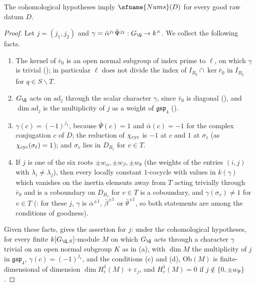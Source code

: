 \begin{proposition}\label{pf:modularity:nums}
The cohomological hypotheses imply $\sfname{Nums}(D)$ for every good raw datum $D$.
\end{proposition}

\begin{proof}
Let $j=(j_1,j_2)$ and $\gamma=\bar\alpha^{j_1}\bar\Psi^{j_2}:G_\Q\to k^\times$. We collect the following facts.
\begin{enumerate}[label=(\alph*)]
\item The kernel of $\bar r_0$ is an open normal subgroup of index prime to $\ell$, on which $\gamma$ is trivial
(); in particular $\ell$ does not divide the index of $I_{B_q}\cap\ker\bar r_0$ in
$I_{B_q}$ for $q\in S\smallsetminus T$.
\item $G_\Q$ acts on $\mathrm{ad}_j$ through the scalar character $\gamma$, since $\bar r_0$ is diagonal
(), and $\dim\mathrm{ad}_j$ is the multiplicity of $j$ as a weight of $\mathfrak{gsp}_4$
().
\item $\gamma(c)=(-1)^{j_1}$, because $\bar\Psi(c)=1$ and $\bar\alpha(c)=-1$ for the complex conjugation $c$ of $D$; the
reduction of $\chi_{\mathrm{cyc}}$ is $-1$ at $c$ and $1$ at $\sigma_\ell$ (as $\chi_{\mathrm{cyc}}(\sigma_\ell)=1$); and $\sigma_v$
lies in $D_{B_v}$ for $v\in T$.
\item If $j$ is one of the six roots $\pm w_\alpha,\pm w_\beta,\pm w_\theta$ (the weights of the entries $(i,j)$ with
$\lambda_i\ne\lambda_j$), then every locally constant $1$-cocycle with values in $k(\gamma)$ which vanishes on the inertia
elements away from $T$ acting trivially through $\bar r_0$ and is a coboundary on $D_{B_v}$ for $v\in T$ is a coboundary,
and $\gamma(\sigma_v)\ne1$ for $v\in T$ (: for these $j$, $\gamma$ is $\bar\alpha^{\pm1}$,
$\bar\beta^{\pm1}$ or $\bar\theta^{\pm1}$, so both statements are among the conditions of goodness).
\end{enumerate}
Given these facts,  gives the assertion for $j$: under the cohomological hypotheses, for every finite
$k[G_{\Q,S}]$-module $M$ on which $G_\Q$ acts through a character $\gamma$ trivial on an open normal subgroup $K$ as in (a),
with $\dim M$ the multiplicity of $j$ in $\mathfrak{gsp}_4$, $\gamma(c)=(-1)^{j_1}$, and the conditions (c) and (d),
$\mathrm{Ob}(M)$ is finite-dimensional of dimension $\dim H^1_c(M)+\varepsilon_j$, and $H^1_c(M)=0$ if
$j\notin\{0,\pm w_\Psi\}$.
\end{proof}

